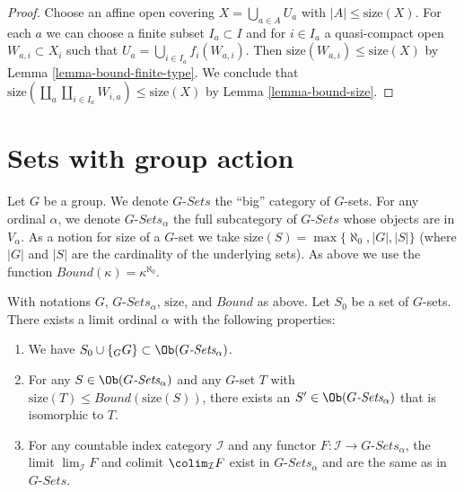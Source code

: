 \begin{proof}
Choose an affine open covering $X = \bigcup_{a \in A} U_a$ with
$|A| \leq \text{size}(X)$. For each $a$ we can choose
a finite subset $I_a \subset I$ and for $i \in I_a$ a quasi-compact open
$W_{a, i} \subset X_i$ such that $U_a = \bigcup_{i \in I_a} f_i(W_{a, i})$.
Then $\text{size}(W_{a, i}) \leq \text{size}(X)$ by
Lemma \ref{lemma-bound-finite-type}.
We conclude that
$\text{size}(\coprod_a \coprod_{i \in I_a} W_{i, a}) \leq \text{size}(X)$
by Lemma \ref{lemma-bound-size}.
\end{proof}





\section{Sets with group action}
\label{section-sets-with-group-action}

\noindent
Let $G$ be a group. We denote $G\textit{-Sets}$ the ``big'' category
of $G$-sets. For any ordinal $\alpha$, we denote
$G\textit{-Sets}_\alpha$ the full subcategory of $G\textit{-Sets}$
whose objects are in $V_\alpha$. As a notion for size of a $G$-set
we take $\text{size}(S) = \max\{\aleph_0, |G|, |S|\}$ (where $|G|$ and
$|S|$ are the cardinality of the underlying sets). As above we use the function
$Bound(\kappa) = \kappa^{\aleph_0}$.

\begin{lemma}
\label{lemma-sets-with-group-action}
With notations $G$, $G\textit{-Sets}_\alpha$, $\text{size}$,
and $Bound$ as above. Let $S_0$ be a set of $G$-sets.
There exists a limit ordinal $\alpha$ with the following properties:
\begin{enumerate}
\item We have $S_0 \cup \{{}_GG\} \subset \Ob(G\textit{-Sets}_\alpha)$.
\item For any $S \in \Ob(G\textit{-Sets}_\alpha)$ and any
$G$-set $T$ with $\text{size}(T) \leq Bound(\text{size}(S))$,
there exists an $S' \in \Ob(G\textit{-Sets}_\alpha)$
that is isomorphic to $T$.
\item For any countable index category $\mathcal{I}$ and
any functor $F : \mathcal{I} \to G\textit{-Sets}_\alpha$, the
limit $\lim_\mathcal{I} F$ and colimit
$\colim_\mathcal{I} F$ exist in $G\textit{-Sets}_\alpha$
and are the same as in $G\textit{-Sets}$.
\end{enumerate}
\end{lemma}


